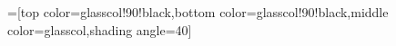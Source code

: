 \tikzset{>=latex} %

=[top color=glasscol!90!black,bottom color=glasscol!90!black,middle color=glasscol,shading angle=40]

%  
%  
%  




